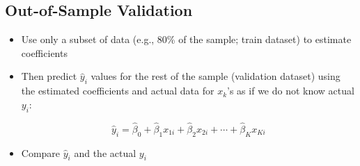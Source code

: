 \documentclass[10pt,article]{article}
\begin{document}
\subsection{Out-of-Sample Validation}
\label{sec:org7db504c}
\begin{itemize}
\item Use only a subset of data (e.g., 80\% of the sample; train dataset) to estimate coefficients
\item Then predict \(\hat{y}_i\) values for the rest of the sample (validation
dataset) using the estimated coefficients and actual data for \(x_{k}\)'s
as if we do not know actual \(y_{i}\):

\[ \hat{y}_{i}= \hat{\beta}_{0} + \hat{\beta}_{1} x_{1i} +
      \hat{\beta}_{2} x_{2i} + \cdots + \hat{\beta}_{K} x_{Ki} \]

\item Compare \(\hat{y}_{i}\) and the actual \(y_{i}\)
\end{itemize}
\end{document}
